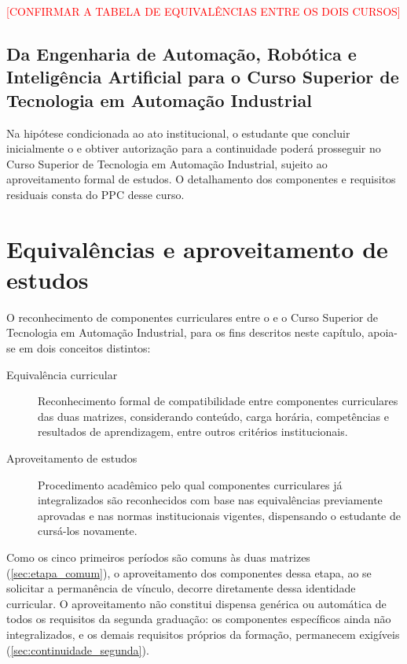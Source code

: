 \textcolor{red}{[CONFIRMAR A TABELA DE EQUIVALÊNCIAS ENTRE OS DOIS CURSOS]}

\subsection{Da Engenharia de Automação, Robótica e Inteligência Artificial para o Curso Superior de Tecnologia em Automação Industrial}

Na hipótese condicionada ao ato institucional, o estudante que concluir inicialmente o \ppccurso e obtiver autorização para a continuidade poderá prosseguir no Curso Superior de Tecnologia em Automação Industrial, sujeito ao aproveitamento formal de estudos. O detalhamento dos componentes e requisitos residuais consta do PPC desse curso.

\section{Equivalências e aproveitamento de estudos}
\label{sec:equivalencias_abi}

O reconhecimento de componentes curriculares entre o \ppccurso e o Curso Superior de Tecnologia em Automação Industrial, para os fins descritos neste capítulo, apoia-se em dois conceitos distintos:

\begin{description}
    \item[Equivalência curricular] Reconhecimento formal de compatibilidade entre componentes curriculares das duas matrizes, considerando conteúdo, carga horária, competências e resultados de aprendizagem, entre outros critérios institucionais.
    \item[Aproveitamento de estudos] Procedimento acadêmico pelo qual componentes curriculares já integralizados são reconhecidos com base nas equivalências previamente aprovadas e nas normas institucionais vigentes, dispensando o estudante de cursá-los novamente.
\end{description}

Como os cinco primeiros períodos são comuns às duas matrizes (\autoref{sec:etapa_comum}), o aproveitamento dos componentes dessa etapa, ao se solicitar a permanência de vínculo, decorre diretamente dessa identidade curricular. O aproveitamento não constitui dispensa genérica ou automática de todos os requisitos da segunda graduação: os componentes específicos ainda não integralizados, e os demais requisitos próprios da formação, permanecem exigíveis (\autoref{sec:continuidade_segunda}).

